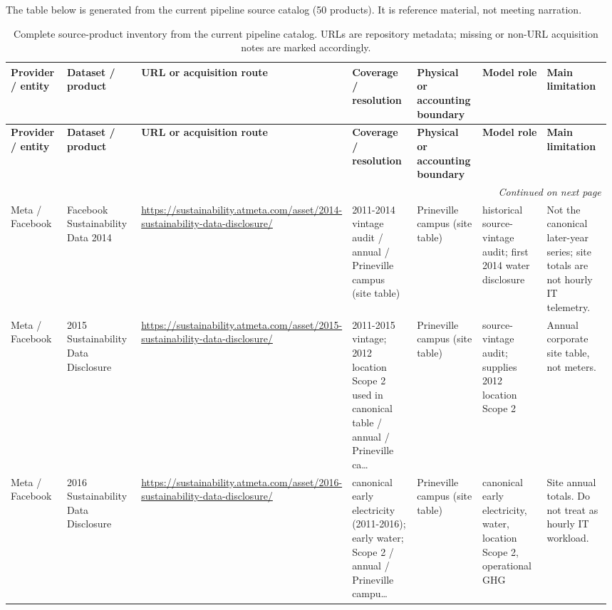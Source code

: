 \documentclass[11pt]{article}
\newcommand{\SourceCount}{50}
\begin{document}
The table below is generated from the current pipeline source catalog (\SourceCount{} products). It is reference material, not meeting narration.


\begingroup
\footnotesize
\setlength{\tabcolsep}{3pt}
\raggedright
\sloppy
\begin{longtable}{@{}p{0.11\linewidth}p{0.15\linewidth}p{0.18\linewidth}p{0.14\linewidth}p{0.12\linewidth}p{0.14\linewidth}p{0.14\linewidth}@{}}
\caption{Complete source-product inventory from the current pipeline catalog. URLs are repository metadata; missing or non-URL acquisition notes are marked accordingly.}\\
\toprule
\textbf{Provider / entity} & \textbf{Dataset / product} & \textbf{URL or acquisition route} & \textbf{Coverage / resolution} & \textbf{Physical or accounting boundary} & \textbf{Model role} & \textbf{Main limitation} \\
\midrule
\endfirsthead
\toprule
\textbf{Provider / entity} & \textbf{Dataset / product} & \textbf{URL or acquisition route} & \textbf{Coverage / resolution} & \textbf{Physical or accounting boundary} & \textbf{Model role} & \textbf{Main limitation} \\
\midrule
\endhead
\midrule
\multicolumn{7}{r}{\emph{Continued on next page}}\\
\endfoot
\bottomrule
\endlastfoot
Meta / Facebook & Facebook Sustainability Data 2014 & \url{https://sustainability.atmeta.com/asset/2014-sustainability-data-disclosure/} & 2011-2014 vintage audit / annual / Prineville campus (site table) & Prineville campus (site table) & historical source-vintage audit; first 2014 water disclosure & Not the canonical later-year series; site totals are not hourly IT telemetry.\\
Meta / Facebook & 2015 Sustainability Data Disclosure & \url{https://sustainability.atmeta.com/asset/2015-sustainability-data-disclosure/} & 2011-2015 vintage; 2012 location Scope 2 used in canonical table / annual / Prineville ca\ldots & Prineville campus (site table) & source-vintage audit; supplies 2012 location Scope 2 & Annual corporate site table, not meters.\\
Meta / Facebook & 2016 Sustainability Data Disclosure & \url{https://sustainability.atmeta.com/asset/2016-sustainability-data-disclosure/} & canonical early electricity (2011-2016); early water; Scope 2 / annual / Prineville campu\ldots & Prineville campus (site table) & canonical early electricity, water, location Scope 2, operational GHG & Site annual totals. Do not treat as hourly IT workload.\\

\end{longtable}
\end{document}
